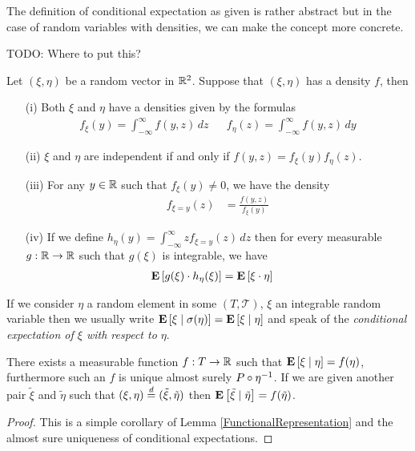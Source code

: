 The definition of conditional expectation as given is rather abstract
but in the case of random variables with densities, we can make the
concept more concrete.

TODO: Where to put this?
\begin{lem}Let $(\xi, \eta)$ be a random vector in $\mathbb{R}^2$.
  Suppose that $(\xi, \eta)$ has a density $f$, then 
\begin{itemize}
\item[(i)]Both  $\xi$ and $\eta$ have a densities given by the
  formulas
\begin{align*}
f_{\xi}(y) = \int_{-\infty}^\infty f(y,z) \, dz & & f_{\eta}(z) = \int_{-\infty}^\infty f(y,z) \, dy
\end{align*}
\item[(ii)]$\xi$ and $\eta$ are independent if and only if $f(y,z) = f_{\xi}(y) f_{\eta}(z) $.
\item[(iii)]For any $y \in \mathbb{R}$ such that $f_{\xi}(y) \neq 0$, we
  have the density
\begin{align*}
f_{\xi=y}(z) &= \frac{f(y,z)}{f_{\xi}(y)}
\end{align*}
\item[(iv)]If we define $h_{\eta}(y) = \int_{-\infty}^\infty z f_{\xi=y}(z)
  \, dz$ then for every measurable $g : \mathbb{R} \to \mathbb{R}$ such that
$g(\xi)$ is integrable, we have
\begin{align*}
\textbf{E}\left[g(\xi) \cdot h_{\eta}(\xi)\right] &= \textbf{E}\left[\xi \cdot \eta\right]
\end{align*}
\end{itemize}
\end{lem}

If we consider $\eta$ a random element in some $(T, \mathcal{T})$, $\xi$ an integrable random
variable then we usually write $\textbf{E}\left[ \xi \mid \sigma(\eta) \right] =
\textbf{E}\left[ \xi \mid \eta \right]$ and speak of the \emph{conditional
  expectation of $\xi$ with respect to $\eta$}.  
\begin{lem}There exists a measurable function $f : T \to \mathbb{R}$ such
  that $\textbf{E}\left[ \xi \mid \eta \right] = f(\eta)$, furthermore such an
  $f$ is unique almost surely $P \circ \eta^{-1}$.  If we are
  given another pair $\tilde{\xi}$ and $\tilde{\eta}$ such that $(\xi,
  \eta) \overset{d}= (\tilde{\xi}, \tilde{\eta})$ then $\textbf{E}\left[ \tilde{\xi} \mid \tilde{\eta} \right] = f(\tilde{\eta})$.
\end{lem}
\begin{proof}This is a simple corollary of Lemma
  \ref{FunctionalRepresentation} and the almost sure uniqueness of
  conditional expectations.
\end{proof}

